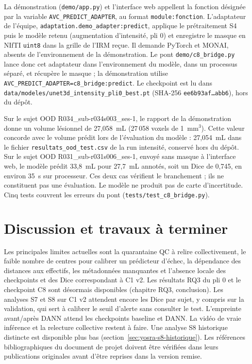 La démonstration (\texttt{demo/app.py}) et l'interface web appellent la fonction désignée par
la variable \texttt{AVC\_PREDICT\_ADAPTER}, au format \texttt{module:fonction}. L'adaptateur de
l'équipe, \texttt{adaptation.demo\_adapter:predict}, applique le prétraitement S4 puis le modèle
retenu (augmentation d'intensité, pli 0) et enregistre le masque en NIfTI \texttt{uint8} dans la
grille de l'IRM reçue. Il demande PyTorch et MONAI, absents de l'environnement de la
démonstration. Le pont \texttt{demo/c8\_bridge.py} lance donc cet adaptateur dans
l'environnement du modèle, dans un processus séparé, et récupère le masque ; la démonstration
utilise \texttt{AVC\_PREDICT\_ADAPTER=c8\_bridge:predict}. Le checkpoint est lu dans
\texttt{data/modeles/unet3d\_intensity\_pli0\_best.pt} (SHA-256 \texttt{ee6b93af\ldots abb6}),
hors du dépôt.

Sur le sujet OOD R034\_sub-r034s003\_ses-1, le rapport de la démonstration donne un volume
lésionnel de 27,058~mL (27\,058 voxels de 1~mm$^3$). Cette valeur concorde avec le volume
prédit lors de l'évaluation du modèle : 27,054~mL dans le fichier \texttt{resultats\_ood\_test.csv}
de la run intensité, conservé hors du dépôt. Sur le sujet OOD R031\_sub-r031s006\_ses-1, envoyé
sans masque à l'interface web, le modèle prédit 33,8~mL pour 27,7~mL annotés, soit un Dice de
0,745, en environ 35~s sur processeur. Ces deux cas vérifient le branchement ; ils ne constituent
pas une évaluation. Le modèle ne produit pas de carte d'incertitude. Cinq tests couvrent les
erreurs du pont (\texttt{tests/test\_c8\_bridge.py}).

\section{Discussion et travaux à terminer}
\label{sec:yosra-discussion}

Les principales limites actuelles sont la quarantaine QC à relire collectivement, le faible nombre de centres pour calibrer un prédicteur d'échec, la dépendance des distances aux effectifs, les métadonnées manquantes et l'absence locale des checkpoints et des Dice correspondant à C1 v2.
Les résultats RQ3 du pli 0 et le checkpoint C8 sont désormais disponibles (chapitre RQ3,
conclusion). Les analyses S7 et S8 sur C1 v2 attendent encore les Dice par sujet, y compris
sur la validation, qui sert à calibrer le seuil d'alerte sans consulter le test. L'empreinte
avant/après DANN attend les checkpoints baseline et DANN. La vidéo de vraie inférence et la
relecture collective restent à faire.
Une analyse S8 historique distincte est disponible plus bas (section~\ref{sec:yosra-s8-historique}).
Les références bibliographiques du document de projet doivent être vérifiées dans leurs publications originales avant d'être reprises dans la version remise.

